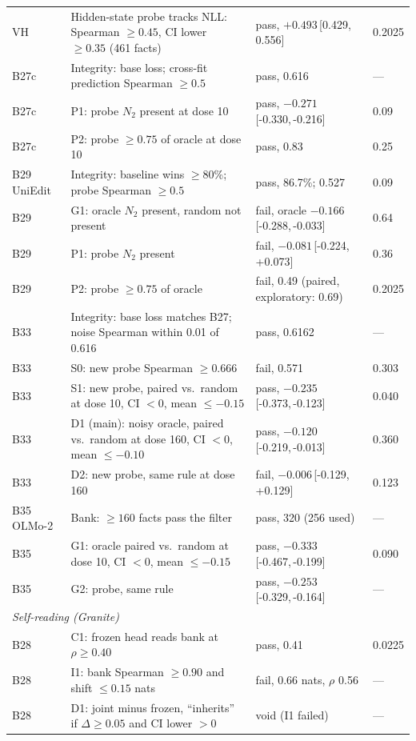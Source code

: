 \documentclass[11pt]{article}
\newcommand{\NTwo}{\ensuremath{N_2}}
\newcommand{\ci}[2]{\,[#1,\,#2]}
\begin{document}
\begin{longtable}{p{2.1cm}p{6.6cm}p{4.6cm}p{1.1cm}}
VH & Hidden-state probe tracks NLL: Spearman $\ge0.45$, CI lower $\ge0.35$ (461 facts) & pass, $+0.493$\ci{0.429}{0.556} & 0.2025 \\
B27c & Integrity: base loss; cross-fit prediction Spearman $\ge0.5$ & pass, 0.616 & --- \\
B27c & P1: probe \NTwo{} present at dose 10 & pass, $-0.271$\ci{-0.330}{-0.216} & 0.09 \\
B27c & P2: probe $\ge0.75$ of oracle at dose 10 & pass, 0.83 & 0.25 \\
B29 UniEdit & Integrity: baseline wins $\ge$80\%; probe Spearman $\ge0.5$ & pass, 86.7\%; 0.527 & 0.09 \\
B29 & G1: oracle \NTwo{} present, random not present & fail, oracle $-0.166$\ci{-0.288}{-0.033} & 0.64 \\
B29 & P1: probe \NTwo{} present & fail, $-0.081$\ci{-0.224}{+0.073} & 0.36 \\
B29 & P2: probe $\ge0.75$ of oracle & fail, 0.49 (paired, exploratory: 0.69) & 0.2025 \\
B33 & Integrity: base loss matches B27; noise Spearman within 0.01 of 0.616 & pass, 0.6162 & --- \\
B33 & S0: new probe Spearman $\ge0.666$ & fail, 0.571 & 0.303 \\
B33 & S1: new probe, paired vs.\ random at dose 10, CI $<0$, mean $\le-0.15$ & pass, $-0.235$\ci{-0.373}{-0.123} & 0.040 \\
B33 & D1 (main): noisy oracle, paired vs.\ random at dose 160, CI $<0$, mean $\le-0.10$ & pass, $-0.120$\ci{-0.219}{-0.013} & 0.360 \\
B33 & D2: new probe, same rule at dose 160 & fail, $-0.006$\ci{-0.129}{+0.129} & 0.123 \\
B35 OLMo-2 & Bank: $\ge160$ facts pass the filter & pass, 320 (256 used) & --- \\
B35 & G1: oracle paired vs.\ random at dose 10, CI $<0$, mean $\le-0.15$ & pass, $-0.333$\ci{-0.467}{-0.199} & 0.090 \\
B35 & G2: probe, same rule & pass, $-0.253$\ci{-0.329}{-0.164} & --- \\
\midrule
\multicolumn{4}{l}{\textit{Self-reading (Granite)}} \\
B28 & C1: frozen head reads bank at $\rho\ge0.40$ & pass, 0.41 & 0.0225 \\
B28 & I1: bank Spearman $\ge0.90$ and shift $\le0.15$ nats & fail, 0.66 nats, $\rho$ 0.56 & --- \\
B28 & D1: joint minus frozen, ``inherits'' if $\Delta\ge0.05$ and CI lower $>0$ & void (I1 failed) & --- \\

\end{longtable}
\end{document}
